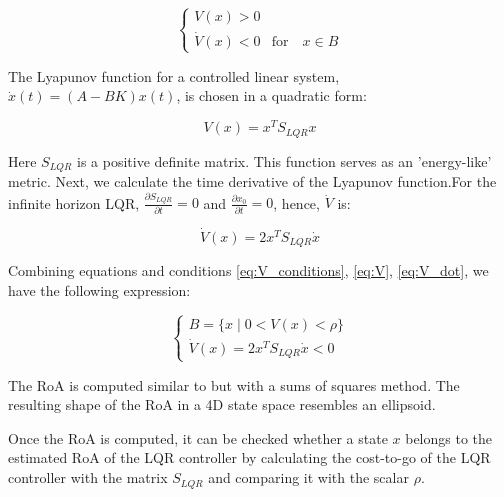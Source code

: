 \begin{equation}
\begin{cases}
   V(x) > 0 \\
   \dot{V}(x) < 0 & \text{for} \quad x \in B
\end{cases}
\label{eq:V_conditions}
\end{equation}

The Lyapunov function for a controlled linear system, \(\dot{x}(t) = (A - BK)x(t)\), is chosen in a quadratic form:

\begin{equation}
  V(x) = x^T S_{LQR} x 
  \label{eq:V}
\end{equation}

Here \(S_{LQR}\) is a positive definite matrix. This function serves as an 'energy-like' metric. Next, we calculate the time derivative of the Lyapunov function.For the infinite horizon LQR, \(\frac{\partial S_{LQR}}{\partial t} = 0\) and \(\frac{\partial x_0}{\partial t} = 0\), hence, \(\dot{V}\) is:

\begin{equation}
\dot{V}(x) = 2x^{T}S_{LQR}\dot{x}
\label{eq:V_dot}
\end{equation}

Combining equations and conditions \ref{eq:V_conditions}, \ref{eq:V}, \ref{eq:V_dot}, we have the following expression:

\begin{equation}
\begin{cases}
    B = \{ x \mid 0 < V(x) < \rho \} \\
    \dot{V}(x) = 2x^T S_{LQR} \dot{x} < 0
\end{cases}
\end{equation}

The RoA is computed similar to \cite{maywald2022co} but with a sums of squares method\cite{tedrake2010lqr}. The resulting shape of the RoA in a 4D state space resembles an ellipsoid.


Once the RoA is computed, it can be checked whether a state \(x\) belongs to the estimated RoA of the LQR controller by calculating the cost-to-go of the LQR controller with the matrix \(S_{LQR}\) and comparing it with the scalar \(\rho\).

